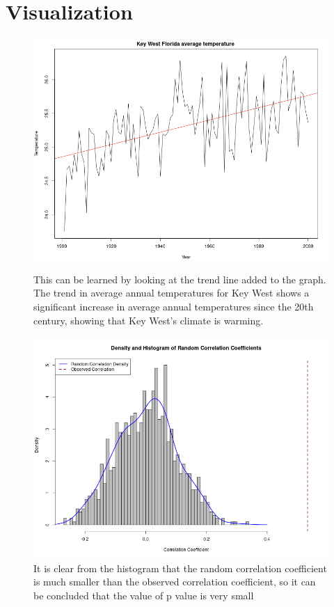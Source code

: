 \documentclass[10pt]{article}
\begin{document}
\section{Visualization}
\begin{figure}[ht]
\centering
\begin{minipage}{0.4\textwidth}
  \centering
  \includegraphics[width=\linewidth]{../data/results.png}
  \caption{This can be learned by looking at the trend line added to the graph. The trend in average annual temperatures for Key West shows a significant increase in average annual temperatures since the 20th century, showing that Key West's climate is warming.}
  \label{fig:temp_trend}
\end{minipage}
\hfill
\begin{minipage}{0.4\textwidth}
  \centering
  \includegraphics[width=\linewidth]{../data/cor.png}
  \caption{It is clear from the histogram that the random correlation coefficient is much smaller than the observed correlation coefficient, so it can be concluded that the value of p value is very small}
  \label{fig:corr_dist}
\end{minipage}
\end{figure}
\end{document}
